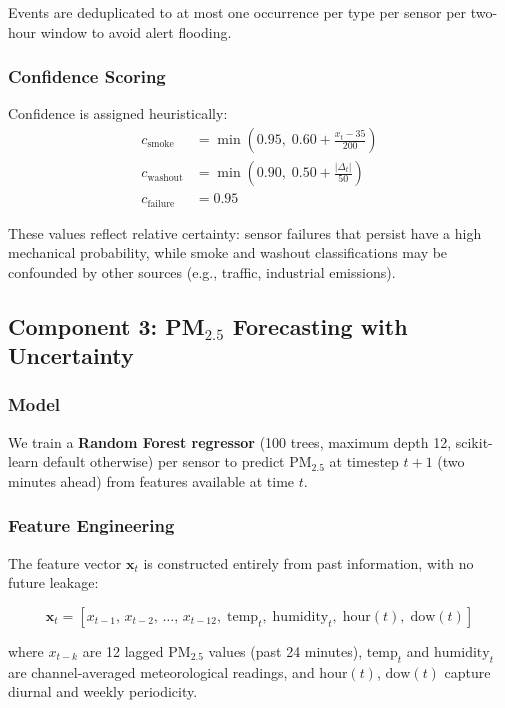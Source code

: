\documentclass[11pt, letterpaper]{article}
\begin{document}
Events are deduplicated to at most one occurrence per type per sensor per
two-hour window to avoid alert flooding.

\subsubsection{Confidence Scoring}

Confidence is assigned heuristically:
\begin{align*}
  c_{\text{smoke}} &= \min\!\left(0.95,\; 0.60 + \frac{x_t - 35}{200}\right) \\
  c_{\text{washout}} &= \min\!\left(0.90,\; 0.50 + \frac{|\Delta_t|}{50}\right) \\
  c_{\text{failure}} &= 0.95
\end{align*}

These values reflect relative certainty: sensor failures that persist have
a high mechanical probability, while smoke and washout classifications may
be confounded by other sources (e.g., traffic, industrial emissions).


\subsection{Component 3: PM$_{2.5}$ Forecasting with Uncertainty}

\subsubsection{Model}

We train a \textbf{Random Forest regressor} (100 trees, maximum depth 12,
scikit-learn default otherwise) per sensor to predict PM$_{2.5}$ at
timestep $t+1$ (two minutes ahead) from features available at time $t$.

\subsubsection{Feature Engineering}

The feature vector $\mathbf{x}_t$ is constructed entirely from past information,
with no future leakage:

\[
  \mathbf{x}_t = \left[
    x_{t-1},\, x_{t-2},\, \ldots,\, x_{t-12},\;
    \text{temp}_t,\;
    \text{humidity}_t,\;
    \text{hour}(t),\;
    \text{dow}(t)
  \right]
\]

where $x_{t-k}$ are 12 lagged PM$_{2.5}$ values (past 24 minutes),
$\text{temp}_t$ and $\text{humidity}_t$ are channel-averaged meteorological
readings, and $\text{hour}(t)$, $\text{dow}(t)$ capture diurnal and weekly
periodicity.
\end{document}
